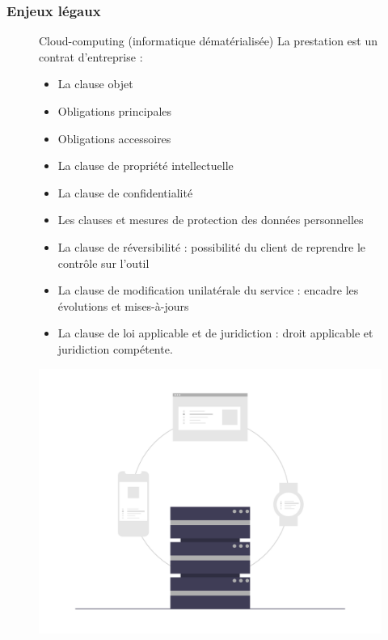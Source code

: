 \documentclass[9pt]{beamer}
\begin{document}
\begin{frame}
	\frametitle{Enjeux légaux}
\begin{figure}[!htb]
   \begin{minipage}{0.7\textwidth}
Cloud-computing (informatique dématérialisée)
La prestation est un contrat d’entreprise : 
\begin{itemize}

\item La clause objet
\item Obligations principales
\item Obligations accessoires
\item La clause de propriété intellectuelle
\item La clause de confidentialité
\item Les clauses et mesures de protection des données personnelles
\item La clause de réversibilité : possibilité du client de reprendre le contrôle sur l’outil
\item La clause de modification unilatérale du service : encadre les évolutions et mises-à-jours
\item La clause de loi applicable et de juridiction : droit applicable et juridiction compétente.

\end{itemize}	 
   \end{minipage}\hfill
   \begin{minipage}{0.3\textwidth}
     \centering
     \includegraphics[width=1\linewidth]{../media/server_cluster}
     \label{Fig:server_cluster}
   \end{minipage}
\end{figure}
\end{frame}
\end{document}
